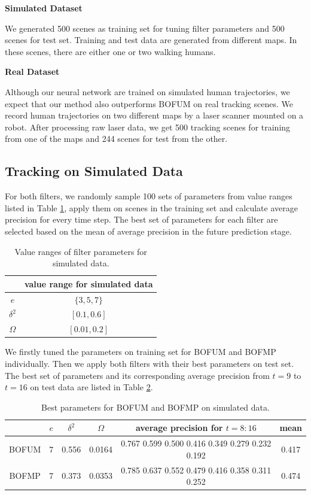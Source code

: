 \textbf{Simulated Dataset}

We generated 500 scenes as training set for tuning filter parameters and 500 scenes for test set. Training and test data are generated from different maps. In these scenes, there are either one or two walking humans.

\textbf{Real Dataset}

Although our neural network are trained on simulated human trajectories, we expect that our method also outperforms BOFUM on real tracking scenes. We record human trajectories on two different maps by a laser scanner mounted on a robot. After processing raw laser data, we get 500 tracking scenes for training from one of the maps and 244 scenes for test from the other. 


\subsection{Tracking on Simulated Data}

For both filters, we randomly sample 100 sets of parameters from value ranges listed in Table \ref{table:param_range_simulated}, apply them on scenes in the training set and calculate average precision for every time step. The best set of parameters for each filter are selected based on the mean of average precision in the future prediction stage. 

\begin{table}[H]
\centering
  \begin{tabular}{c|c}
    \hline
     &   value range for simulated data \\ \hline
    \( e \) & \( \{3, 5, 7\} \) \\
    \(  \delta^2\) & \( [0.1, 0.6]\) \\   
   \( \Omega \) & \( [0.01, 0.2] \) \\
   \hline
 \end{tabular}
\caption{Value ranges of filter parameters for simulated data.}
\label{table:param_range_simulated}
\end{table}

 We firstly tuned the parameters on training set for BOFUM and BOFMP individually. Then we apply both filters with their best parameters on test set. The best set of parameters and its corresponding average precision from \( t=9 \) to \( t=16 \) on test data are listed in Table \ref{table:best_param_simulated}. 

\begin{table}[H]
\centering  
\begin{tabularx}{\textwidth}{c|c|c|c|c|c}
    \hline
    & $ e $ & $ \delta^2 $ & $ \Omega $ & average precision for $t=8:16 $ & mean\\ \hline
    BOFUM & 7 & 0.556 & 0.0164 &  0.767  0.599  0.500    0.416  0.349  0.279  0.232  0.192 & 0.417 \\
    BOFMP & 7 & 0.373 & 0.0353 & 0.785  0.637  0.552  0.479  0.416  0.358  0.311  0.252 & 0.474 \\
   \hline
  \end{tabularx}
\caption{Best parameters for BOFUM and BOFMP on simulated data.}
\label{table:best_param_simulated}
\end{table}

